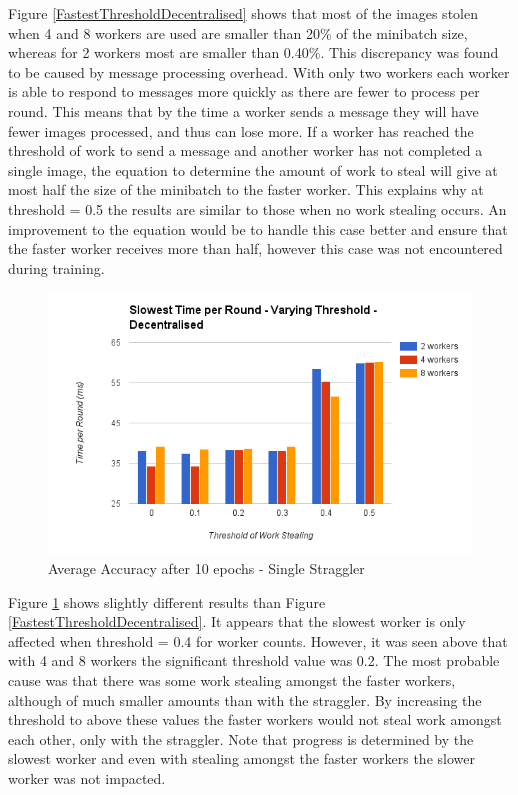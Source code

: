 \documentclass[12pt]{article}
\begin{document}
Figure \ref{FastestThresholdDecentralised} shows that most of the images stolen when 4 and 8 workers are used are smaller than 20\% of the minibatch size, whereas for 2 workers most are smaller than 0.40\%. This discrepancy was found to be caused by message processing overhead. With only two workers each worker is able to respond to messages more quickly as there are fewer to process per round. This means that by the time a worker sends a  message they will have fewer images processed, and thus can lose more.
\newline
\newline
If a worker has reached the threshold of work to send a  message and another worker has not completed a single image, the equation to determine the amount of work to steal will give at most half the size of the minibatch to the faster worker. This explains why at threshold = 0.5 the results are similar to those when no work stealing occurs. An improvement to the equation would be to handle this case better and ensure that the faster worker receives more than half, however this case was not encountered during training.

\begin{figure}[H]
  \centering
  \includegraphics[width=6in]{SlowestThresholdDecentralised}
  \caption[]{Average Accuracy after 10 epochs - Single Straggler}
  \label{SlowestThresholdDecentralised}
\end{figure}

Figure \ref{SlowestThresholdDecentralised} shows slightly different results than Figure \ref{FastestThresholdDecentralised}. It appears that the slowest worker is only affected when threshold = 0.4 for worker counts. However, it was seen above that with 4 and 8 workers the significant threshold value was 0.2. The most probable cause was that there was some work stealing amongst the faster workers, although of much smaller amounts than with the straggler. By increasing the threshold to above these values the faster workers would not steal work amongst each other, only with the straggler. Note that progress is determined by the slowest worker and even with stealing amongst the faster workers the slower worker was not impacted.
\end{document}
